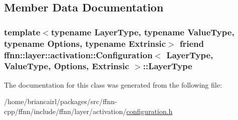 \subsection{Member Data Documentation}
\hypertarget{classffnn_1_1layer_1_1activation_1_1_configuration_a183c2a31aadeb5f7f04c7caa65e079f0}{
\subsubsection[{Layer\-Type}]{\setlength{\rightskip}{0pt plus 5cm}template$<$typename Layer\-Type, typename Value\-Type, typename Options, typename Extrinsic$>$ friend {\bf ffnn\-::layer\-::activation\-::\-Configuration}$<$ Layer\-Type, Value\-Type, Options, Extrinsic $>$\-::Layer\-Type}}\label{classffnn_1_1layer_1_1activation_1_1_configuration_a183c2a31aadeb5f7f04c7caa65e079f0}


The documentation for this class was generated from the following file\-:\begin{DoxyCompactItemize}
\item 
/home/briancairl/packages/src/ffnn-\/cpp/ffnn/include/ffnn/layer/activation/\hyperlink{activation_2configuration_8h}{configuration.\-h}\end{DoxyCompactItemize}
